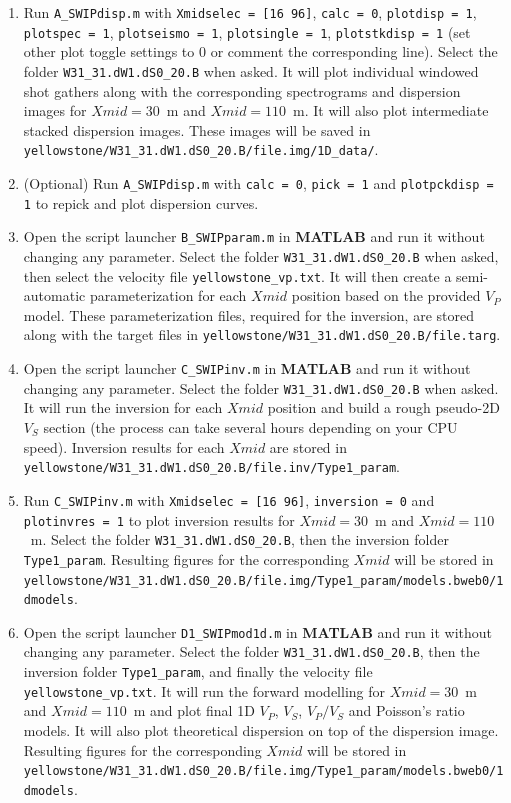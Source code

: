 \documentclass[twoside,a4paper]{article}
\def\MATLAB{\textbf{MATLAB}}
\begin{document}
\begin{enumerate}[leftmargin=*]
\item Run \verb|A_SWIPdisp.m| with \verb|Xmidselec = [16 96]|, \verb|calc = 0|, \verb|plotdisp = 1|, \verb|plotspec = 1|, \verb|plotseismo = 1|, \verb|plotsingle = 1|, \verb|plotstkdisp = 1| (set other plot toggle settings to 0 or comment the corresponding line). Select the folder \verb|W31_31.dW1.dS0_20.B| when asked. It will plot individual windowed shot gathers along with the corresponding spectrograms and dispersion images for $Xmid = 30$~m and $Xmid = 110$~m. It will also plot intermediate stacked dispersion images. These images will be saved in \verb|yellowstone/W31_31.dW1.dS0_20.B/file.img/1D_data/|.

\item (Optional) Run \verb|A_SWIPdisp.m| with \verb|calc = 0|, \verb|pick = 1| and \verb|plotpckdisp = 1| to repick and plot dispersion curves.

\item Open the script launcher \verb|B_SWIPparam.m| in {\MATLAB} and run it without changing any parameter. Select the folder \verb|W31_31.dW1.dS0_20.B| when asked, then select the velocity file \verb|yellowstone_vp.txt|. It will then create a semi-automatic parameterization for each $Xmid$ position based on the provided $V_P$ model. These parameterization files, required for the inversion, are stored along with the target files in \verb|yellowstone/W31_31.dW1.dS0_20.B/file.targ|.

\item Open the script launcher \verb|C_SWIPinv.m| in {\MATLAB} and run it without changing any parameter. Select the folder \verb|W31_31.dW1.dS0_20.B| when asked. It will run the inversion for each $Xmid$ position and build a rough pseudo-2D $V_S$ section (the process can take several hours depending on your CPU speed). Inversion results for each $Xmid$ are stored in \verb|yellowstone/W31_31.dW1.dS0_20.B/file.inv/Type1_param|.

\item Run \verb|C_SWIPinv.m| with \verb|Xmidselec = [16 96]|, \verb|inversion = 0| and \verb|plotinvres = 1| to plot inversion results for $Xmid = 30$~m and $Xmid = 110$~m. Select the folder \verb|W31_31.dW1.dS0_20.B|, then the inversion folder \verb|Type1_param|. Resulting figures for the corresponding $Xmid$ will be stored in \verb|yellowstone/W31_31.dW1.dS0_20.B/file.img/Type1_param/models.bweb0/1dmodels|.

\item Open the script launcher \verb|D1_SWIPmod1d.m| in {\MATLAB} and run it without changing any parameter. Select the folder \verb|W31_31.dW1.dS0_20.B|, then the inversion folder \verb|Type1_param|, and finally the velocity file \verb|yellowstone_vp.txt|. It will run the forward modelling for $Xmid = 30$~m and $Xmid = 110$~m and plot final 1D $V_P$, $V_S$, $V_P/V_S$ and Poisson's ratio models. It will also plot theoretical dispersion on top of the dispersion image. Resulting figures for the corresponding $Xmid$ will be stored in \verb|yellowstone/W31_31.dW1.dS0_20.B/file.img/Type1_param/models.bweb0/1dmodels|.


\end{enumerate}
\end{document}
